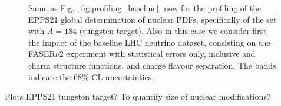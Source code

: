 \begin{figure}[t]
\caption{Same as Fig.~\ref{fig:profiling_baseline},
now for the profiling of the EPPS21 global determination of nuclear PDFs,
specifically of the set with $A=184$ (tungsten target).
%
Also in this case we consider first the impact of the baseline LHC neutrino dataset, consisting
on the FASER$\nu$2 experiment
with statistical errors only, inclusive and charm structure functions,  and charge flavour
separation.
%
The bands indicate the 68\% CL uncertainties.
}
\label{fig:profiling_baseline_nuclear}
\end{figure}


Plots EPPS21 tungsten target? To quantify size of nuclear modifications?
